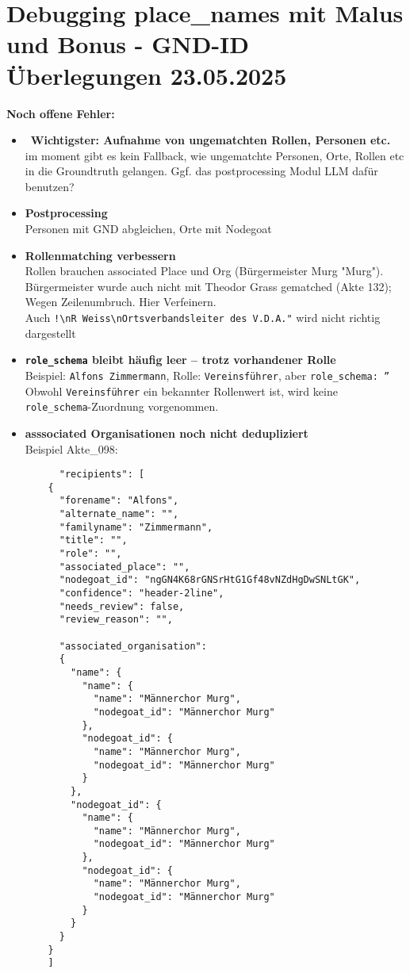 \documentclass{article}
\begin{document}
\noindent\hrulefill
\section{Debugging place\_names mit Malus und Bonus - GND-ID Überlegungen \small 23.05.2025}

\noindent\textbf{Noch offene Fehler:}
\begin{itemize}
    \item\faExclamationTriangle\  \textbf{Wichtigster: Aufnahme von ungematchten Rollen, Personen etc.} \\ im moment gibt es kein Fallback, wie ungematchte Personen, Orte, Rollen etc in die Groundtruth gelangen. Ggf. das postprocessing Modul LLM dafür benutzen?
    \item \textbf{Postprocessing} \\ Personen mit GND abgleichen, Orte mit Nodegoat
    \item \textbf{Rollenmatching verbessern}\\ Rollen brauchen associated Place und Org (Bürgermeister Murg \textrightarrow{} "Murg"). Bürgermeister wurde auch nicht mit Theodor Grass gematched (Akte 132); Wegen Zeilenumbruch. Hier Verfeinern. \\Auch \verb|!\nR Weiss\nOrtsverbandsleiter des V.D.A."| wird nicht richtig dargestellt
    \item \textbf{\texttt{role\_schema} bleibt häufig leer – trotz vorhandener Rolle}\\Beispiel: \texttt{Alfons Zimmermann}, Rolle: \texttt{Vereinsführer}, aber \texttt{role\_schema: ''}\\Obwohl \texttt{Vereinsführer} ein bekannter Rollenwert ist, wird keine \texttt{role\_schema}-Zuordnung vorgenommen.
    \item \textbf{asssociated Organisationen noch nicht dedupliziert}\\Beispiel Akte\_098:
      \begin{verbatim}
      "recipients": [
    {
      "forename": "Alfons",
      "alternate_name": "",
      "familyname": "Zimmermann",
      "title": "",
      "role": "",
      "associated_place": "",
      "nodegoat_id": "ngGN4K68rGNSrHtG1Gf48vNZdHgDwSNLtGK",
      "confidence": "header-2line",
      "needs_review": false,
      "review_reason": "",

      "associated_organisation": 
      {
        "name": {
          "name": {
            "name": "Männerchor Murg",
            "nodegoat_id": "Männerchor Murg"
          },
          "nodegoat_id": {
            "name": "Männerchor Murg",
            "nodegoat_id": "Männerchor Murg"
          }
        },
        "nodegoat_id": {
          "name": {
            "name": "Männerchor Murg",
            "nodegoat_id": "Männerchor Murg"
          },
          "nodegoat_id": {
            "name": "Männerchor Murg",
            "nodegoat_id": "Männerchor Murg"
          }
        }
      }
    }
    ]


\end{verbatim}
\end{itemize}
\end{document}
